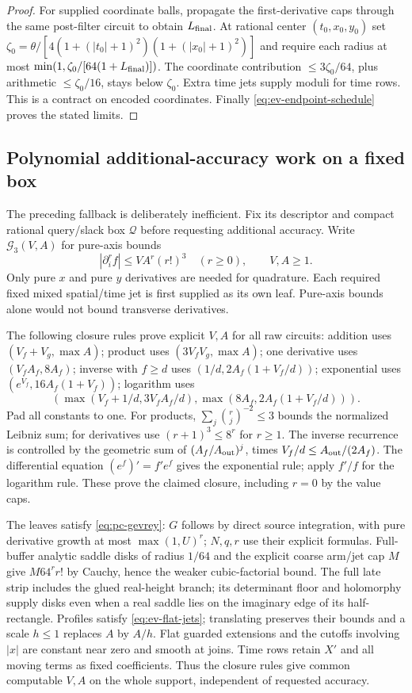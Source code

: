 \begin{proof}
For supplied coordinate balls, propagate the first-derivative caps
through the same post-filter circuit to obtain $L_{\rm final}$. At
rational center $(t_0,x_0,y_0)$ set
$\zeta_0=\theta/[4(1+(|t_0|+1)^2)(1+(|x_0|+1)^2)]$ and require
each radius at most $\min(1,\zeta_0/[64(1+L_{\rm final})])$.
The coordinate contribution $\le3\zeta_0/64$, plus arithmetic
$\le\zeta_0/16$, stays below $\zeta_0$. Extra time jets supply
moduli for time rows. This is a contract on encoded coordinates.
Finally \eqref{eq:ev-endpoint-schedule} proves the stated limits.
\end{proof}

\subsection{Polynomial additional-accuracy work on a fixed box}
The preceding fallback is deliberately inefficient. Fix its descriptor
and compact rational query/slack box $\mathcal Q$ before requesting
additional accuracy. Write $\mathcal G_3(V,A)$ for pure-axis bounds
\begin{equation}
 |\partial_i^rf|\le VA^r(r!)^3\quad(r\ge0),\qquad V,A\ge1.
 \label{eq:pc-gevrey}
\end{equation}
Only pure $x$ and pure $y$ derivatives are needed for quadrature.
Each required fixed mixed spatial/time jet is first supplied as its
own leaf. Pure-axis bounds alone would not bound transverse derivatives.

The following closure rules prove explicit $V,A$ for all raw circuits:
addition uses $(V_f+V_g,\max A)$; product uses
$(3V_fV_g,\max A)$; one derivative uses $(V_fA_f,8A_f)$;
inverse with $f\ge d$ uses $(1/d,2A_f(1+V_f/d))$;
exponential uses $(e^{V_f},16A_f(1+V_f))$; logarithm uses
\[
 \left(\max(V_f+1/d,3V_fA_f/d),
       \max(8A_f,2A_f(1+V_f/d))\right).
\]
Pad all constants to one. For products,
$\sum_j\binom rj^{-2}\le3$ bounds the normalized Leibniz sum;
for derivatives use $(r+1)^3\le8^r$ for $r\ge1$. The inverse
recurrence is controlled by the geometric sum of
$(A_f/A_{\rm out})^j$, times $V_f/d\le A_{\rm out}/(2A_f)$.
The differential equation $(e^f)'=f'e^f$ gives the exponential rule;
apply $f'/f$ for the logarithm rule. These prove the claimed closure,
including $r=0$ by the value caps.

The leaves satisfy \eqref{eq:pc-gevrey}: $G$ follows by direct source
integration, with pure derivative growth at most $\max(1,U)^r$;
$N,q,r$ use their explicit formulas. Full-buffer analytic saddle
disks of radius $1/64$ and the explicit coarse arm/jet cap $M$ give
$M64^rr!$ by Cauchy, hence the weaker cubic-factorial bound. The
full late strip includes the glued real-height branch; its determinant
floor and holomorphy supply disks even when a real saddle lies on the
imaginary edge of its half-rectangle. Profiles satisfy
\eqref{eq:ev-flat-jets}; translating preserves their bounds and a
scale $h\le1$ replaces $A$ by $A/h$. Flat guarded extensions and
the cutoffs involving $|x|$ are constant near zero and smooth at joins.
Time rows retain $X'$ and all moving terms as fixed coefficients.
Thus the closure rules give common computable $V,A$ on the whole
support, independent of requested accuracy.

